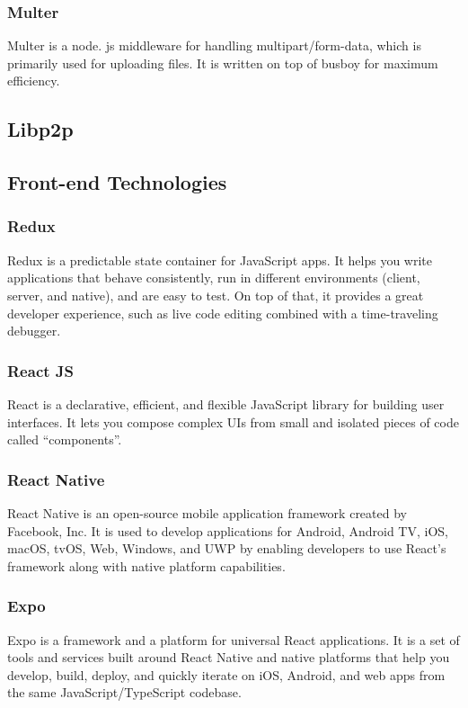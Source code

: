     \subsubsection{Multer}
    Multer is a node. js middleware for handling multipart/form-data, 
    which is primarily used for uploading files. It is written on top of busboy for maximum efficiency.

    \subsection{Libp2p}


\subsection{Front-end Technologies}

    \subsubsection{Redux}
    Redux is a predictable state container for JavaScript apps.
    It helps you write applications that behave consistently, run in different environments 
    (client, server, and native), and are easy to test. On top of that, it provides a great developer experience, 
    such as live code editing combined with a time-traveling debugger.
    
    \subsubsection{React JS}
    React is a declarative, efficient, and flexible JavaScript library for building user interfaces. 
    It lets you compose complex UIs from small and isolated pieces of code called “components”.

    \subsubsection{React Native}
    React Native is an open-source mobile application framework created by Facebook, Inc.
    It is used to develop applications for Android, Android TV, iOS, macOS, tvOS, Web, Windows, and UWP by enabling developers to use React's framework along with native platform capabilities.

    \subsubsection{Expo}
    Expo is a framework and a platform for universal React applications. 
    It is a set of tools and services built around React Native and native platforms that help you develop, build, 
    deploy, and quickly iterate on iOS, Android, and web apps from the same JavaScript/TypeScript codebase.

